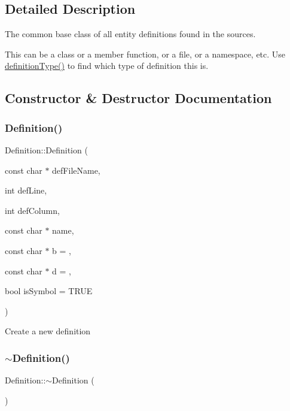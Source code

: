 \subsection{Detailed Description}
The common base class of all entity definitions found in the sources.

This can be a class or a member function, or a file, or a namespace, etc. Use \mbox{\hyperlink{class_definition_intf_ac8ee00bc1af5558ae37f6896d16f5a3a}{definition\+Type()}} to find which type of definition this is. 

\subsection{Constructor \& Destructor Documentation}
\mbox{\label{class_definition_afdf318b0b806e2b5b1fcdcf682bc338b}} 
\subsubsection{\texorpdfstring{Definition()}{Definition()}}
{\footnotesize\ttfamily Definition\+::\+Definition (\begin{DoxyParamCaption}\item[{const char $\ast$}]{def\+File\+Name,  }\item[{int}]{def\+Line,  }\item[{int}]{def\+Column,  }\item[{const char $\ast$}]{name,  }\item[{const char $\ast$}]{b = {},  }\item[{const char $\ast$}]{d = {},  }\item[{bool}]{is\+Symbol = {\ttfamily TRUE} }\end{DoxyParamCaption})}

Create a new definition \mbox{\label{class_definition_a37def2c2ca8cdc02e9f614657169e654}} 
\subsubsection{\texorpdfstring{$\sim$Definition()}{~Definition()}}
{\footnotesize\ttfamily Definition\+::$\sim$\+Definition (\begin{DoxyParamCaption}{ }\end{DoxyParamCaption})\hspace{0.3cm}{\ttfamily [virtual]}}

